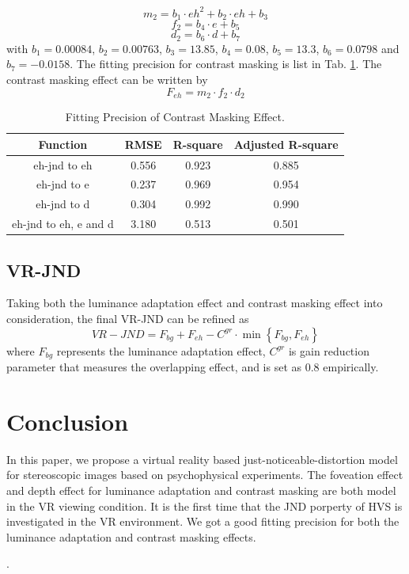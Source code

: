 \documentclass[journal]{IEEEtran}
\begin{document}
\begin{equation}
m_2=b_1\cdot eh^2+b_2\cdot eh+b_3
\end{equation}
\begin{equation}
f_2=b_4\cdot e+b_5
\end{equation}
\begin{equation}
d_2=b_6\cdot d+b_7
\end{equation}
with $b_1=0.00084$, $b_2=0.00763$, $b_3=13.85$, $b_4=0.08$, $b_5=13.3$, $b_6=0.0798$ and $b_7=-0.0158$.
The fitting precision for contrast masking is list in Tab. \ref{tab:fit_precition_eh}. The contrast masking effect can be written by
\begin{equation}
F_{eh}=m_2\cdot f_2 \cdot d_2
\end{equation}
\begin{table}[htbp] 
	\centering
	\caption{Fitting Precision of Contrast Masking Effect.}
	\begin{tabular}{|c|c|c|c|}
		\hline
		Function & RMSE & R-square & Adjusted R-square \\
		\hline
		eh-jnd to eh & 0.556 & 0.923 & 0.885 \\
		\hline
		eh-jnd to e & 0.237 & 0.969 & 0.954 \\
		\hline
		eh-jnd to d & 0.304 & 0.992 & 0.990 \\
		\hline
		eh-jnd to eh, e and d & 3.180 & 0.513 & 0.501 \\
		\hline
	\end{tabular}%
	\label{tab:fit_precition_eh}%
\end{table}%

\subsection{VR-JND}
Taking both the luminance adaptation effect and contrast masking effect into consideration, the final VR-JND can be refined as
\begin{equation}
VR-JND= F_{bg}+F_{eh}-C^{gr}\cdot \min \left\{F_{bg}, F_{eh}\right\}
\end{equation}
where $F_{bg}$ represents the luminance adaptation effect, $C^{gr}$ is gain reduction parameter that measures the overlapping effect, and is set as $0.8$ empirically.

\section{Conclusion}
In this paper, we propose a virtual reality based just-noticeable-distortion model for stereoscopic images based on psychophysical experiments. The foveation effect and depth effect for luminance adaptation and contrast masking are both model in the VR viewing condition. It is the first time that the JND porperty of HVS is investigated in the VR environment. We got a good fitting precision for both the luminance adaptation and contrast masking effects.

.

\ifCLASSOPTIONcaptionsoff
  \newpage
\fi

{
	\small
	
	
}
\end{document}

